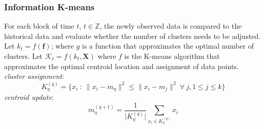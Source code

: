 \subsubsection*{Information K-means}
For each block of time $t$, $t \in \mathbb{Z}$, the newly observed data is compared to the historical data and evaluate whether the number of clusters needs to be adjusted.\\
Let $k_{t} = f(\textbf{f})$; where $g$ is a function that approximates the optimal number of clusters.
Let $\mathcal{K}_{t} = f(k_{t}, \textbf{X})$ where $f$ is the K-means algorithm that approximates the optimal centroid location and assignment of data points.\\

\noindent\textit{cluster assignment}:
\begin{equation}
K_{\eta}^{(q)} = \{x_i~:~\lVert x_i - m_{\eta} \rVert^{2} \leq \lVert x_i - m_{j} \rVert^{2}~\forall~j, 1 \leq j \leq k\}
\end{equation}
\textit{centroid update}:
\begin{equation}
m_{\eta}^{(q + 1)} = \frac{1}{\lvert K_{\eta}^{(q)}\rvert}\sum_{x_{i} \in K_{\eta}^{(q)}} x_{i}
\end{equation}
